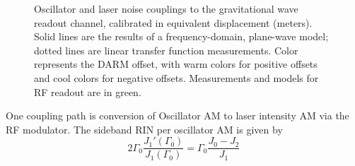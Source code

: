 \begin{figure}

\caption{\label{noise-couplings}Oscillator and laser noise couplings to the gravitational wave readout channel, calibrated in equivalent displacement (meters).  Solid lines are the results of a frequency-domain, plane-wave model; dotted lines are linear transfer function measurements.  Color represents the DARM offset, with warm colors for positive offsets and cool colors for negative offsets.  Measurements and models for RF readout are in green.}
\end{figure}

One coupling path is conversion of Oscillator AM to laser intensity
AM via the RF modulator. The sideband RIN per oscillator AM is given
by 
\begin{equation}
2\Gamma_{0}\frac{J_{1}'(\Gamma_{0})}{J_{1}(\Gamma_{0})}=\Gamma_{0}\frac{J_{0}-J_{2}}{J_{1}}
\end{equation}

